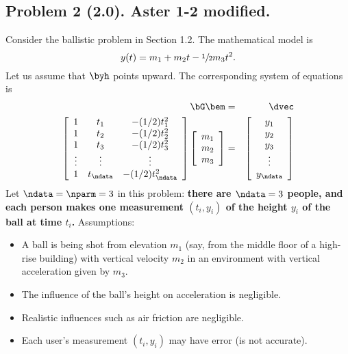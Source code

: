 \documentclass[11pt,titlepage,fleqn]{article}
\begin{document}
\clearpage\pagebreak
\subsection*{Problem 2 (2.0). Aster 1-2 modified.}

Consider the ballistic problem in Section 1.2.
The mathematical model is \citep[][Eq.~1.13]{Aster}
%
\begin{equation}
y(t) = m_1 + m_2 t - \sfrac{1}{2} m_3 t^2.
\label{ballistic}
\end{equation}
%
Let us assume that $\byh$ points upward.
The corresponding system of equations is
%
\begin{eqnarray}
\bG \bem &=& \dvec
\label{lsq}
\\
\left[
\begin{array}{ccc}
1 & t_1 & -(1/2)t_1^2 \\
1 & t_2 & -(1/2)t_2^2 \\
1 & t_3 & -(1/2)t_3^2 \\
\vdots & \vdots & \vdots \\
1 & t_\ndata & -(1/2)t_\ndata^2 \\
\end{array}
\right]
\left[
\begin{array}{c}
m_1 \\ m_2 \\ m_3
\end{array}
\right]
&=& 
\left[
\begin{array}{c}
y_1 \\ y_2 \\ y_3 \\ \vdots \\ y_\ndata
\end{array}
\right]
\end{eqnarray}
%
Let $\ndata = \nparm = 3$ in this problem: {\bf there are $\ndata=3$ people, and each person makes one measurement $(t_i,y_i)$ of the height $y_i$ of the ball at time $t_i$.} Assumptions:
%
\begin{itemize}
\item A ball is being shot from elevation $m_1$ (say, from the middle floor of a high-rise building) with vertical velocity $m_2$ in an environment with vertical acceleration given by $m_3$.
\item The influence of the ball's height on acceleration is negligible.
\item Realistic influences such as air friction are negligible.
\item Each user's measurement $(t_i,y_i)$ may have error (\ie is not accurate).
\end{itemize}
\end{document}
